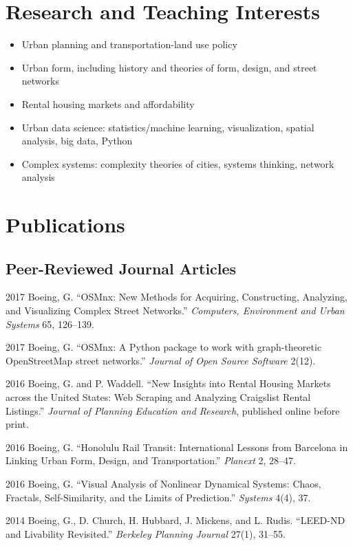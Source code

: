 \documentclass{academiccv}
\begin{document}
\section*{Research and Teaching Interests}

\begin{itemize}
\item Urban planning and transportation-land use policy
\item Urban form, including history and theories of form, design, and street networks
\item Rental housing markets and affordability
\item Urban data science: statistics/machine learning, visualization, spatial analysis, big data, Python
\item Complex systems: complexity theories of cities, systems thinking, network analysis
\end{itemize}



\section*{Publications}

\subsection*{Peer-Reviewed Journal Articles}

\begin{tablist}

\item[2017] \tab Boeing, G. \enquote{OSMnx: New Methods for Acquiring, Constructing, Analyzing, and Visualizing Complex Street Networks.} \emph{Computers, Environment and Urban Systems} 65, 126--139.

\item[2017] \tab Boeing, G. \enquote{OSMnx: A Python package to work with graph-theoretic OpenStreetMap street networks.} \emph{Journal of Open Source Software} 2(12).

\item[2016] \tab Boeing, G. and P. Waddell. \enquote{New Insights into Rental Housing Markets across the United States: Web Scraping and Analyzing Craigslist Rental Listings.} \emph{Journal of Planning Education and Research}, published online before print.

\item[2016] \tab Boeing, G. \enquote{Honolulu Rail Transit: International Lessons from Barcelona in Linking Urban Form, Design, and Transportation.} \emph{Planext} 2, 28--47.

\item[2016] \tab Boeing, G. \enquote{Visual Analysis of Nonlinear Dynamical Systems: Chaos, Fractals, Self-Similarity, and the Limits of Prediction.} \emph{Systems} 4(4), 37.

\item[2014] \tab Boeing, G., D. Church, H. Hubbard, J. Mickens, and L. Rudis. \enquote{LEED-ND and Livability Revisited.} \emph{Berkeley Planning Journal} 27(1), 31--55.

\end{tablist}
\end{document}
